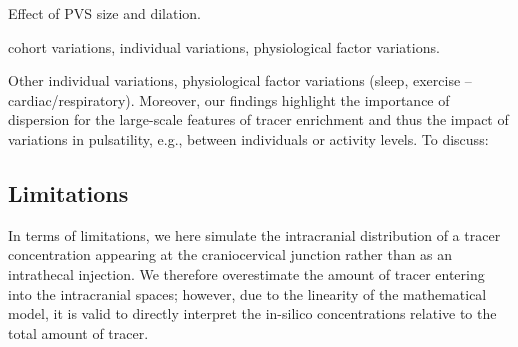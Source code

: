 \documentclass[fleqn,10pt]{wlscirep}
\newcommand{\draft}[1]{\textcolor{lightgray}{#1}}
\begin{document}
Effect of PVS size and dilation. 

cohort variations, individual variations, physiological factor
variations.

Other individual variations, physiological factor variations (sleep,
exercise -- cardiac/respiratory). Moreover, our findings highlight the
importance of dispersion for the large-scale features of tracer
enrichment and thus the impact of variations in pulsatility, e.g.,
between individuals or activity levels. To discuss: \cite{hauglund2025norepinephrine}

\draft{\lipsum[1-5]}


\subsection*{Limitations}

In terms of limitations, we here simulate the intracranial
distribution of a tracer concentration appearing at the craniocervical
junction rather than as an intrathecal injection. We therefore
overestimate the amount of tracer entering into the intracranial
spaces; however, due to the linearity of the mathematical model, it is
valid to directly interpret the in-silico concentrations relative to
the total amount of tracer.
\end{document}
